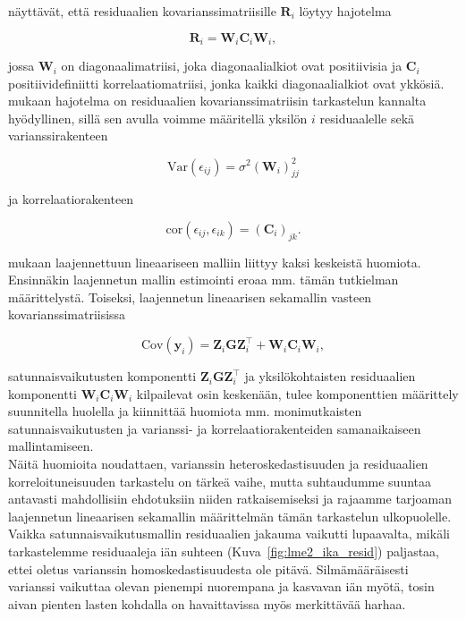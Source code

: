 \documentclass[finnish]{docopts}
\begin{document}
\cite{pinheiro00} näyttävät, että residuaalien kovarianssimatriisille $\bm{R}_i$ löytyy hajotelma

$$
\bm{R}_i = \bm{W}_i \bm{C}_i \bm{W}_i,
$$

jossa $\bm{W}_i$ on diagonaalimatriisi, joka diagonaalialkiot ovat positiivisia ja $\bm{C}_i$ positiividefiniitti korrelaatiomatriisi, jonka kaikki diagonaalialkiot ovat ykkösiä. \cite{pinheiro00} mukaan hajotelma on residuaalien kovarianssimatriisin tarkastelun kannalta hyödyllinen, sillä sen avulla voimme määritellä yksilön $i$ residuaalelle sekä varianssirakenteen 

$$
\text{Var}(\epsilon_{ij}) = \sigma^2(\bm{W}_i)^2_{jj}
$$

ja korrelaatiorakenteen

$$
\text{cor}(\epsilon_{ij}, \epsilon_{ik}) = (\bm{C}_i)_{jk}.
$$

\cite{pinheiro00} mukaan laajennettuun lineaariseen malliin liittyy kaksi keskeistä huomiota. Ensinnäkin laajennetun mallin estimointi eroaa mm. tämän tutkielman määrittelystä. Toiseksi, laajennetun lineaarisen sekamallin vasteen kovarianssimatriisissa

$$
\text{Cov}(\bm{y}_i) = \bm{Z}_i \bm{G} \bm{Z}_i^\top +  \bm{W}_i \bm{C}_i \bm{W}_i,
$$

satunnaisvaikutusten komponentti $\bm{Z}_i \bm{G} \bm{Z}_i^\top$ ja yksilökohtaisten residuaalien komponentti $\bm{W}_i \bm{C}_i \bm{W}_i$ kilpailevat osin keskenään, tulee komponenttien määrittely suunnitella huolella ja kiinnittää huomiota mm. monimutkaisten satunnaisvaikutusten ja varianssi- ja korrelaatiorakenteiden samanaikaiseen mallintamiseen.\\

Näitä huomioita noudattaen, varianssin heteroskedastisuuden ja residuaalien korreloituneisuuden tarkastelu on tärkeä vaihe, mutta suhtaudumme suuntaa antavasti mahdollisiin ehdotuksiin niiden ratkaisemiseksi ja rajaamme \cite{pinheiro00} tarjoaman laajennetun lineaarisen sekamallin määrittelmän tämän tarkastelun ulkopuolelle.\\

Vaikka satunnaisvaikutusmallin residuaalien jakauma vaikutti lupaavalta, mikäli tarkastelemme residuaaleja iän suhteen (Kuva~\ref{fig:lme2_ika_resid}) paljastaa, ettei oletus varianssin homoskedastisuudesta ole pitävä. Silmämääräisesti varianssi vaikuttaa olevan pienempi nuorempana ja kasvavan iän myötä, tosin aivan pienten lasten kohdalla on havaittavissa myös merkittävää harhaa.\\
\end{document}
